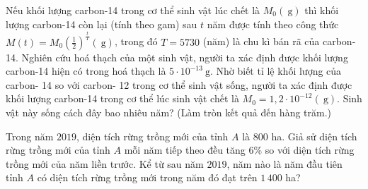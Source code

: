 \begin{bt}%
 
 Nếu khối lượng carbon-14 trong cơ thể sinh vật lúc chết là $M_0(\mathrm{~g})$ thì khối lượng carbon-14 còn lại (tính theo gam) sau $t$ năm được tính theo công thức $M(t)=M_0\left(\frac{1}{2}\right)^{\frac{t}{T}}(\mathrm{~g})$, trong đó $T=5730$ (năm) là chu kì bán rã của carbon-14. Nghiên cứu hoá thạch của một sinh vật, người ta xác định được khối lượng carbon-14 hiện có trong hoá thạch là $5 \cdot 10^{-13} \mathrm{~g}$. Nhờ biết tỉ lệ khối lượng của carbon- 14 so với carbon- 12 trong cơ thể sinh vật sống, người ta xác định được khối lượng carbon-14 trong cơ thể lúc sinh vật chết là $M_0=1{,}2 \cdot 10^{-12}(\mathrm{~g})$. Sinh vật này sống cách đây bao nhiêu năm? (Làm tròn kết quả đến hàng trăm.)
\end{bt}

\begin{bt}%

	Trong năm $2019$, diện tích rừng trồng mới của tỉnh $A$ là $800$ ha. Giả sử diện tích rừng trồng mới của tỉnh $A$ mỗi năm tiếp theo đều tăng   $6\%$ so với diện tích rừng trồng mới của năm liền trước. Kể từ sau năm  $2019$, năm nào là năm đầu tiên tỉnh $A$ có diện tích rừng trồng mới trong năm đó đạt trên  $1\,400$ ha?
\end{bt}

